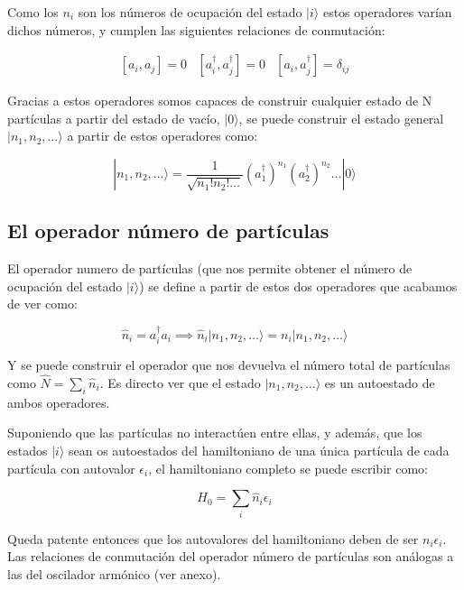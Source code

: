 \documentclass{article} %
\begin{document}
Como los $n_i$ son los números de ocupación del estado $|i \rangle$ estos operadores varían dichos números, y cumplen las siguientes relaciones de conmutación:

\begin{equation}
\begin{array}{ccc}
[a_i, a_j] = 0 & [a_i^{\dagger}, a_j^{\dagger}] = 0 & [a_i, a_j^{\dagger}] = \delta_{ij}
\end{array}
\end{equation}

Gracias a estos operadores somos capaces de construir cualquier estado de N partículas a partir del estado de vacío, $|0\rangle$, se puede construir el estado general $|n_1, n_2, \ldots\rangle$ a partir de estos operadores como:

\begin{equation}
|n_1, n_2, \ldots \rangle = \frac{1}{\sqrt{n_1! n_2! \ldots}} \left(a_1^{\dagger}\right)^{n_1} \left(a_2^{\dagger}\right)^{n_2} \ldots |0\rangle
\end{equation}

\subsection{El operador número de partículas}

El operador numero de partículas (que nos permite obtener el número de ocupación del estado $|i\rangle$) se define a partir de estos dos operadores que acabamos de ver como:

\begin{equation}
\hat{n}_i = a_i^{\dagger} a_i \implies \hat{n}_i |n_1, n_2, \ldots\rangle = n_i |n_1,  n_2, \ldots\rangle
\end{equation}

Y se puede construir el operador que nos devuelva el número total de partículas como $\hat{N} = \sum_i \hat{n}_i$. Es directo ver que el estado $|n_1, n_2, \ldots\rangle$ es un autoestado de ambos operadores.

Suponiendo que las partículas no interactúen entre ellas, y además, que los estados $|i\rangle$ sean os autoestados del hamiltoniano de una única partícula de cada partícula con autovalor $\epsilon_i$, el hamiltoniano completo se puede escribir como:

\begin{equation}
H_0 = \sum_i \hat{n}_i\epsilon_i
\end{equation}

Queda patente entonces que los autovalores del hamiltoniano deben de ser $n_i\epsilon_i$. Las relaciones de conmutación del operador número de partículas son análogas a las del oscilador armónico (ver anexo).
\end{document}
